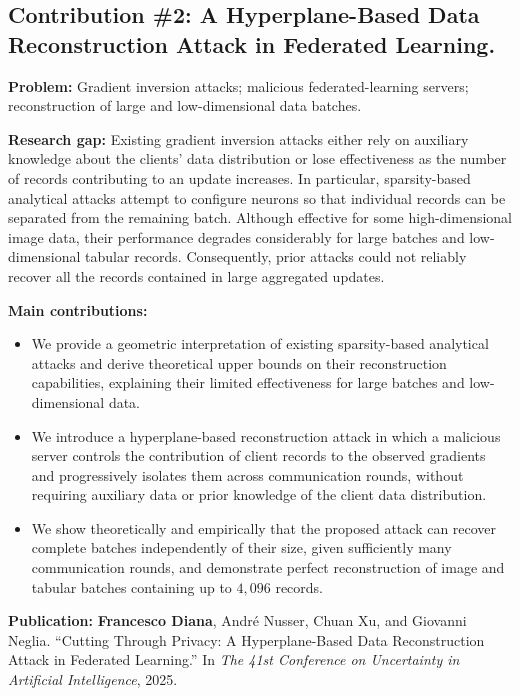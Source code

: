 \subsection*{Contribution \#2: A Hyperplane-Based
Data Reconstruction Attack in Federated Learning.}

\noindent\textbf{Problem:} Gradient inversion attacks; malicious federated-learning servers; reconstruction
of large and low-dimensional data batches.

\medskip
\noindent\textbf{Research gap:}
Existing gradient inversion attacks either rely on auxiliary knowledge about the
clients' data distribution or lose effectiveness as the number of records
contributing to an update increases. In particular, sparsity-based analytical
attacks attempt to configure neurons so that individual records can be separated
from the remaining batch. Although effective for some high-dimensional image
data, their performance degrades considerably for large batches and
low-dimensional tabular records. Consequently, prior attacks could not reliably
recover all the records contained in large aggregated updates.

\noindent\textbf{Main contributions:}
\begin{itemize}
    \item We provide a geometric interpretation of existing sparsity-based
    analytical attacks and derive theoretical upper bounds on their
    reconstruction capabilities, explaining their limited effectiveness for
    large batches and low-dimensional data.

    \item We introduce a hyperplane-based reconstruction attack in which a
    malicious server controls the contribution of client records to the
    observed gradients and progressively isolates them across communication
    rounds, without requiring auxiliary data or prior knowledge of the client
    data distribution.

    \item We show theoretically and empirically that the proposed attack can
    recover complete batches independently of their size, given sufficiently
    many communication rounds, and demonstrate perfect reconstruction of image
    and tabular batches containing up to \(4{,}096\) records.
\end{itemize}

\medskip
\noindent\textbf{Publication:}
 \textbf{Francesco Diana}, André Nusser, Chuan Xu, and Giovanni Neglia.
    ``Cutting Through Privacy: A Hyperplane-Based Data Reconstruction Attack
    in Federated Learning.''
    In \emph{The 41st Conference on Uncertainty in Artificial Intelligence},
    2025.


